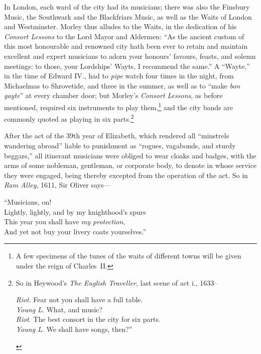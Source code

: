 In London, each ward of the city had its musicians; there was also the Finsbury
Music, the Southwark and the Blackfriars Music, as well as the Waits of
London and Westminster. Morley thus alludes to the Waits, in the dedication
of his \textit{Consort Lessons} to the Lord Mayor and Aldermen: “As the ancient
custom of this most honourable and renowned city hath been ever to retain and
maintain excellent and expert musicians to adorn your honours’ favours, feasts,
and solemn meetings: to those, your Lordships’ Wayts, I recommend the same.”
A “Wayte,” in the time of Edward IV., had to \textit{pipe} watch four times in the
night, from Michaelmas to Shrovetide, \pagebreak and three in the summer, as well as to
“make \textit{bon gayte}” at every chamber door; but Morley’s \textit{Consort Lessons}, as
before mentioned, required six instruments to play them,\footnote{\textit{}
A few specimens of the tunes of the waits of different
towns will be given under the reign of Charles~II.}
and the city bands are
commonly quoted as playing in six parts.\footnote{\textit{}
So in Heywood’s \textit{The English Traveller}, last scene of act i., 1633--
\begin{fnverse}
\textit{Riot}. Fear not you shall have a full table.\\
\textit{Young L}. What, and music?\\
\textit{Riot}. The best consort in the city for six parts.\\
\textit{Young L}. We shall have songs, then?”\\
\end{fnverse}
}

After the act of the 39th year of Elizabeth, which rendered all “minstrels
wandering abroad” liable to punishment as “rogues, vagabonds, and sturdy
beggars,” all itinerant musicians were obliged to wear cloaks and badges, with the
arms of some nobleman, gentleman, or corporate body, to denote in whose service
they were engaged, being thereby excepted from the operation of the act. So in
\textit{Ram Alley}, 1611, Sir Oliver says—
\settowidth{\versewidth}{Lightly, lightly, and by my knighthood’s spurs}
\begin{scverse}
\vin\vin\vin\vin “Musicians, on!\\
Lightly, lightly, and by my knighthood’s spurs\\
This year you shall have \textit{my protection},\\
And yet not buy your livery coats yourselves.”
\end{scverse}

